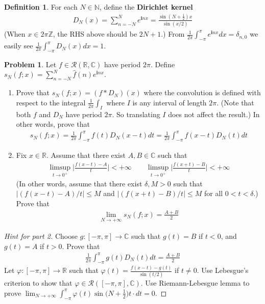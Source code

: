 \documentclass[12pt,b5paper,notitlepage]{article}
\theoremstyle{definition}
\newtheorem{df}{Definition}[section]
\newtheorem{prob}{\color{red}Problem}[section]
\theoremstyle{plain}
\newcommand{\wht}{\widehat}
\newcommand{\scr}{\mathscr}
\newcommand{\im}{\mathbf{i}}
\newcommand{\Cbb}{\mathbb C}
\newcommand{\Nbb}{\mathbb N}
\newcommand{\Zbb}{\mathbb Z}
\newcommand{\Rbb}{\mathbb R}
\newcommand{\dps}{\displaystyle}
\numberwithin{equation}{section}
\begin{document}
\begin{df}
For each $N\in\Nbb$, define the \textbf{Dirichlet kernel} 
\begin{align*}
D_N(x)=\sum_{n=-N}^Ne^{\im nx}=\frac{\sin(N+\frac 12)x}{\sin(x/2)}
\end{align*}
(When $x\in2\pi\Zbb$, the RHS above should be $2N+1$.) From $\frac 1{2\pi}\int_{-\pi}^\pi e^{\im nx}dx=\delta_{n,0}$ we easily see $\dps\frac 1{2\pi}\int_{-\pi}^\pi D_N(x)dx=1$. 
\end{df}


\begin{prob}\label{lb447}
Let $f\in\scr R(\Rbb,\Cbb)$ have period $2\pi$. Define $\dps s_N(f;x)=\sum_{n=-N}^N\wht f(n)e^{\im nx}$.
\begin{enumerate}
\item Prove that $s_N(f;x)=(f*D_N)(x)$ where the convolution is defined with respect to the integral $\frac 1{2\pi}\int_I$ where $I$ is any interval of length $2\pi$. (Note that both $f$ and $D_N$ have period $2\pi$. So translating $I$ does not affect the result.) In other words, prove that
\begin{align}
s_N(f;x)=\frac 1{2\pi}\int_{-\pi}^{\pi} f(t)D_N(x-t)dt=\frac 1{2\pi}\int_{-\pi}^{\pi} f(x-t)D_N(t)dt
\end{align}
\item Fix $x\in\Rbb$. Assume that there exist $A,B\in\Cbb$ such that 
\begin{align}
\limsup_{t\rightarrow 0^+}\Big|\frac{f(x-t)-A}{t}\Big|<+\infty\qquad \limsup_{t\rightarrow 0^+}\Big|\frac{f(x+t)-B}{t}\Big|<+\infty
\end{align}
(In other words, assume that there exist $\delta,M>0$ such that $|(f(x-t)-A)/t|\leq M$ and $|(f(x+t)-B)/t|\leq M$ for all $0<t<\delta$.) Prove that
\begin{align}
\lim_{N\rightarrow+\infty} s_N(f;x)=\frac{A+B}2
\end{align}
\end{enumerate}
\end{prob}


\begin{proof}[Hint for part 2]
Choose $g:[-\pi,\pi]\rightarrow\Cbb$ such that $g(t)=B$ if $t<0$, and $g(t)=A$ if $t>0$. Prove that
\begin{align}
\frac 1{2\pi}\int_{-\pi}^\pi g(t)D_N(t)dt=\frac{A+B}2  \label{eq193}
\end{align}
Let $\varphi:[-\pi,\pi]\rightarrow \Rbb$ such that $\dps\varphi(t)=\frac{f(x-t)-g(t)}{\sin(t/2)}$ if $t\neq 0$. Use Lebesgue's criterion to show that $\varphi\in\scr R([-\pi,\pi],\Cbb)$. Use Riemann-Lebesgue lemma to prove $\dps\lim_{N\rightarrow+\infty}\int_{-\pi}^\pi \varphi(t)\sin\big(N+\frac 12\big)t\cdot dt=0$. %
\end{proof}
\end{document}
